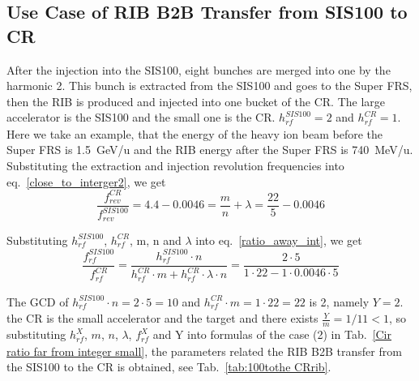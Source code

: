 \subsection{Use Case of RIB B2B Transfer from SIS100 to CR} 
\label{RIB_100_CR}
After the injection into the SIS100, eight bunches are merged into one by the harmonic 2. This bunch is extracted from the SIS100 and goes to the Super FRS, then the RIB is produced and injected into one bucket of the CR. The large accelerator is the SIS100 and the small one is the CR. $h^{\mathit{SIS100}}_\mathit{rf}=2$ and $h^{\mathit{CR}}_\mathit{rf}=1$. Here we take an example, that the energy of the heavy ion beam before the Super FRS is \SI{1.5}{GeV/\atomicmassunit} and the RIB energy after the Super FRS is \SI{740}{MeV/\atomicmassunit}. Substituting the extraction and injection revolution frequencies into eq.~\ref{close_to_interger2}, we get
\begin{equation} 
\frac{f_{\mathit{rev}}^{\mathit{CR}}}{f_{\mathit{rev}}^{\mathit{SIS100}}}=4.4-0.0046=\frac{m}{n}+ \lambda=\frac{22}{5}-0.0046
\end{equation}

Substituting $h^{\mathit{SIS100}}_\mathit{rf}$, $h^{\mathit{CR}}_\mathit{rf}$, m, n and $\lambda$ into eq.~\ref{ratio_away_int}, we get
\begin{equation} 
\frac{f_{\mathit{rf}}^{\mathit{SIS100}}}{f_{\mathit{rf}}^{\mathit{CR}}}=\frac{h^{\mathit{SIS100}}_\mathit{rf}\cdot n}{h^{\mathit{CR}}_\mathit{rf} \cdot m+ h^{\mathit{CR}}_\mathit{rf} \cdot\lambda\cdot n}=\frac{2\cdot 5}{1 \cdot 22- 1 \cdot0.0046\cdot 5}
\end{equation}

The GCD of $h^{\mathit{SIS100}}_\mathit{rf}\cdot n=2\cdot5=10$ and $h^{\mathit{CR}}_\mathit{rf} \cdot m=1\cdot 22=22$ is 2, namely $Y=2$. the CR is the small accelerator and the target and there exists $\frac{Y}{m}=1/11<1$, so substituting $h^X_\mathit{rf}$, $m$, $n$, $\lambda$, $f_{\mathit{rf}}^{X}$ and Y into formulas of the case (2) in Tab.~\ref{Cir ratio far from integer small}, the parameters related the RIB B2B transfer from the SIS100 to the CR is obtained, see Tab.~\ref{tab:100tothe CRrib}.

